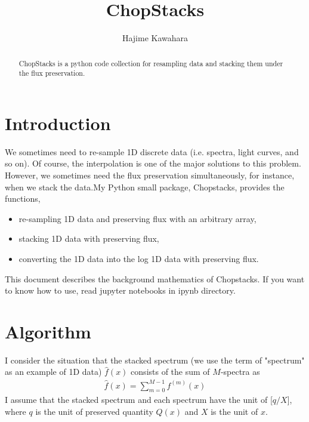 \documentclass[iop, twocolumn, tighten]{emulateapj}
\begin{document}
\title{ChopStacks}

\author{Hajime Kawahara}

\begin{abstract}
ChopStacks is a python code collection for resampling data and stacking them under the flux preservation.
\end{abstract}
\keywords{}

\section{Introduction}
We sometimes need to re-sample 1D discrete data (i.e. spectra, light curves, and so on). Of course, the interpolation is one of the major solutions to this problem. However, we sometimes need the flux preservation simultaneously, for instance, when we stack the data.My Python small package, Chopstacks, provides the functions, 

\begin{itemize}
\item re-sampling 1D data and preserving flux with an arbitrary array, 
\item stacking 1D data with preserving flux,
\item converting the 1D data into the log 1D data with preserving flux.
\end{itemize}

This document describes the background mathematics of Chopstacks. If you want to know how to use, read jupyter notebooks in ipynb directory.

\section{Algorithm}

I consider the situation that the stacked spectrum (we use the term of "spectrum" as an example of 1D data) $\hat{f}(x)$ consists of the sum of $M$-spectra as 
\begin{eqnarray}
  \hat{f} (x) = \sum_{m=0}^{M-1} f^{(m)} (x)
\end{eqnarray}
I assume that the stacked spectrum and each spectrum have the unit of [$q/X$], where $q$ is the unit of preserved quantity $Q(x)$ and $X$ is the unit of $x$.
\end{document}
